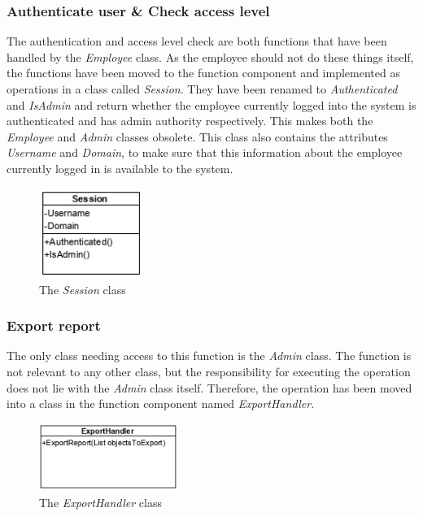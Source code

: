 \subsubsection{Authenticate user \& Check access level}
The authentication and access level check are both functions that have been handled by the \textit{Employee} class. As the employee should not do these things itself, the functions have been moved to the function component and implemented as operations in a class called \textit{Session}. They have been renamed to \textit{Authenticated} and \textit{IsAdmin} and return whether the employee currently logged into the system is authenticated and has admin authority respectively. This makes both the \textit{Employee} and \textit{Admin} classes obsolete. This class also contains the attributes \textit{Username} and \textit{Domain}, to make sure that this information about the employee currently logged in is available to the system.
\begin{figure}[H]
    \centering
    \includegraphics[width=0.3\textwidth]{figures/FunctionComponent/Session.png}
    \caption{The \textit{Session} class}
    \label{fig:session_class}
\end{figure}

\subsubsection{Export report}
The only class needing access to this function is the \textit{Admin} class. The function is not relevant to any other class, but the responsibility for executing the operation does not lie with the \textit{Admin} class itself. Therefore, the operation has been moved into a class in the function component named \textit{ExportHandler}.
\begin{figure}[H]
    \centering
    \includegraphics[width=0.4\textwidth]{figures/FunctionComponent/ExportHandler.png}
    \caption{The \textit{ExportHandler} class}
    \label{fig:ExportHandler}
\end{figure}

